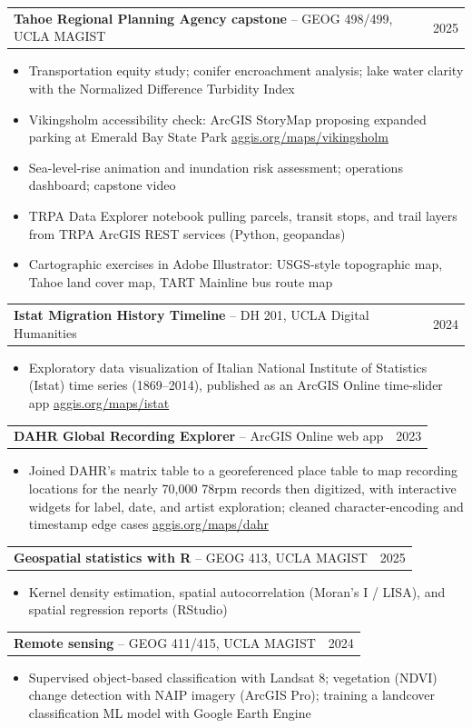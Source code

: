 \documentclass[letterpaper,10pt]{article}
\makeatletter
\newlength{\entrygap}   \setlength{\entrygap}{1pt}   %
\newlength{\groupgap}   \setlength{\groupgap}{4pt}   %
\newlength{\bulletgap}  \setlength{\bulletgap}{0pt}  %
\newlength{\groupindent}\setlength{\groupindent}{0.15in} %
\newcommand{\resumeItem}[1]{\item \small{#1}}
\newif\ifresumecont \resumecontfalse
\newcommand{\resumeProjectHeading}[2]{%
  \vspace{\entrygap}\item
    \begin{tabular*}{0.97\textwidth}[t]{l@{\extracolsep{\fill}}r}
      \small#1 & \small#2 \\
    \end{tabular*}%
}
\newcommand{\cvGroupHeading}[1]{%
  \resumecontfalse
  \vspace{\groupgap}\item[]\hspace*{-\groupindent}{\small\bfseries\scshape #1}%
}
\newcommand{\resumeItemListStart}{%
  \begin{itemize}[leftmargin=\groupindent, itemsep=\bulletgap,
                  parsep=0pt, topsep=1pt, partopsep=0pt]}
\newcommand{\resumeItemListEnd}{\resumecontfalse\end{itemize}}
\newcommand{\lnk}[2]{{\scriptsize\href{#1}{\underline{#2}}}}
\makeatother
\begin{document}
    \resumeProjectHeading
      {\textbf{Tahoe Regional Planning Agency capstone} -- GEOG 498/499, UCLA MAGIST}{2025}
      \resumeItemListStart
        \resumeItem{Transportation equity study; conifer encroachment analysis; lake water clarity with the Normalized Difference Turbidity Index}
        \resumeItem{Vikingsholm accessibility check: ArcGIS StoryMap proposing expanded parking at Emerald Bay State Park \lnk{https://aggis.org/maps/vikingsholm/}{aggis.org/maps/vikingsholm}}
        \resumeItem{Sea-level-rise animation and inundation risk assessment; operations dashboard; capstone video}
        \resumeItem{TRPA Data Explorer notebook pulling parcels, transit stops, and trail layers from TRPA ArcGIS REST services (Python, geopandas)}
        \resumeItem{Cartographic exercises in Adobe Illustrator: USGS-style topographic map, Tahoe land cover map, TART Mainline bus route map}
      \resumeItemListEnd

    \resumeProjectHeading
      {\textbf{Istat Migration History Timeline} -- DH 201, UCLA Digital Humanities}{2024}
      \resumeItemListStart
        \resumeItem{Exploratory data visualization of Italian National Institute of Statistics (Istat) time series (1869--2014), published as an ArcGIS Online time-slider app \lnk{https://aggis.org/maps/istat/}{aggis.org/maps/istat}}
      \resumeItemListEnd

    \resumeProjectHeading
      {\textbf{DAHR Global Recording Explorer} -- ArcGIS Online web app}{2023}
      \resumeItemListStart
        \resumeItem{Joined DAHR's matrix table to a georeferenced place table to map recording locations for the nearly 70,000 78rpm records then digitized, with interactive widgets for label, date, and artist exploration; cleaned character-encoding and timestamp edge cases \lnk{https://aggis.org/maps/dahr/}{aggis.org/maps/dahr}}
      \resumeItemListEnd


    \cvGroupHeading{Topics}

    \resumeProjectHeading
      {\textbf{Geospatial statistics with R} -- GEOG 413, UCLA MAGIST}{2025}
      \resumeItemListStart
        \resumeItem{Kernel density estimation, spatial autocorrelation (Moran's I / LISA), and spatial regression reports (RStudio)}
      \resumeItemListEnd

    \resumeProjectHeading
      {\textbf{Remote sensing} -- GEOG 411/415, UCLA MAGIST}{2024}
      \resumeItemListStart
        \resumeItem{Supervised object-based classification with Landsat 8; vegetation (NDVI) change detection with NAIP imagery (ArcGIS Pro); training a landcover classification ML model with Google Earth Engine}
      \resumeItemListEnd
\end{document}
